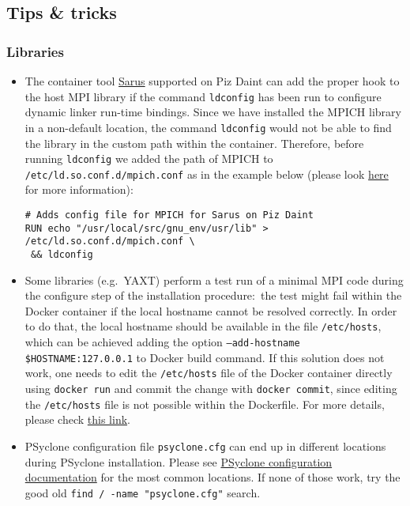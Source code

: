\documentclass[twoside,a4paper,12pt]{article}
\begin{document}
\subsection{Tips \& tricks}\label{tips_tricks}
%
%
\subsubsection{Libraries}\label{libraries_tips_tricks}
%
\begin{itemize}

\item The container tool
\href{https://user.cscs.ch/tools/containers/sarus/}{Sarus} supported on Piz Daint
can add the proper hook to the host MPI library if the command \texttt{ldconfig}
has been run to configure dynamic linker run-time bindings. Since we have
installed the MPICH library in a non-default location, the command \texttt{ldconfig}
would not be able to find the library in the custom path within the container.
Therefore, before running \texttt{ldconfig} we added the path of MPICH to
\texttt{/etc/ld.so.conf.d/mpich.conf} as in the example below (please look
\href{https://unix.stackexchange.com/questions/425251/using-ldconfig-and-ld-so-conf-versus-ld-library-path}
{here} for more information):
\begin{Verbatim}[fontsize=\small]
# Adds config file for MPICH for Sarus on Piz Daint
RUN echo "/usr/local/src/gnu_env/usr/lib" > /etc/ld.so.conf.d/mpich.conf \
 && ldconfig
\end{Verbatim}

\item Some libraries (e.g.\ YAXT) perform a test run of a minimal MPI code
during the configure step of the installation procedure:\ the test might fail
within the Docker container if the local hostname cannot be resolved correctly.
In order to do that, the local hostname should be available in the file
\texttt{/etc/hosts}, which can be achieved adding the option
\texttt{--add-hostname \$HOSTNAME:127.0.0.1} to Docker build command. If this
solution does not work, one needs to edit the \texttt{/etc/hosts} file of the
Docker container directly using \texttt{docker run} and commit the change with
\texttt{docker commit}, since editing the \texttt{/etc/hosts} file is not
possible within the Dockerfile. For more details, please check
\href{https://stackoverflow.com/questions/23112515/mpich2-gethostbyname-failed/23118973}
{this link}.

\item PSyclone configuration file \texttt{psyclone.cfg} can end up in different
locations during PSyclone installation. Please see
\href{https://psyclone.readthedocs.io/en/stable/getting_going.html#configuration}
{PSyclone configuration documentation} for the most common locations. If none of
those work, try the good old \texttt{find / -name "psyclone.cfg"} search.

\end{itemize}
%
%
\end{document}
